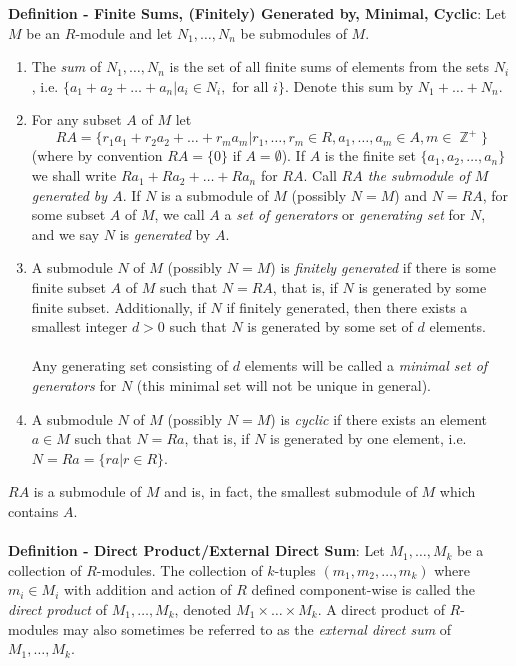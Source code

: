 \documentclass{article}
\DeclareMathOperator{\Z}{\mathbb{Z}}
\begin{document}
\textbf{Definition - Finite Sums, (Finitely) Generated by, Minimal, Cyclic}: Let $M$ be an $R$-module and let $N_1, \dots, N_n$ be submodules of $M$. \begin{enumerate}
    \item The \textit{sum} of $N_1, \dots, N_n$ is the set of all finite sums of elements from the sets $N_i$, i.e. $\{a_1 + a_2 + \dots + a_n | a_i \in N_i, \text{ for all } i\}$. Denote this sum by $N_1 + \dots + N_n$.
    \item For any subset $A$ of $M$ let $$RA = \{r_1 a_1 + r_2 a_2 + \dots +r_ma_m | r_1, \dots, r_m \in R, a_1, \dots, a_m \in A, m \in \Z^+\}$$ (where by convention $RA = \{0\}$ if $A = \emptyset$). If $A$ is the finite set $\{a_1 , a_2, \dots, a_n\}$ we shall write $Ra_1 + Ra_2 + \dots + Ra_n$ for $RA$. Call \textit{$RA$ the submodule of $M$ generated by $A$}. If $N$ is a submodule of $M$ (possibly $N = M$) and $N = RA$, for some subset $A$ of $M$, we call $A$ a \textit{set of generators} or \textit{generating set} for $N$, and we say $N$ is \textit{generated} by $A$.
    \item A submodule $N$ of $M$ (possibly $N = M$) is \textit{finitely generated} if there is some finite subset $A$ of $M$ such that $N = RA$, that is, if $N$ is generated by some finite subset. Additionally, if $N$ if finitely generated, then there exists a smallest integer $d > 0$ such that $N$ is generated by some set of $d$ elements. \\ \\
    Any generating set consisting of $d$ elements will be called a \textit{minimal set of generators} for $N$ (this minimal set will not be unique in general).
    \item A submodule $N$ of $M$ (possibly $N = M$) is \textit{cyclic} if there exists an element $a \in M$ such that $N = Ra$, that is, if $N$ is generated by one element, i.e. $N = Ra = \{ra | r \in R\}$. 
\end{enumerate} $ $ \\
$RA$ is a submodule of $M$ and is, in fact, the smallest submodule of $M$ which contains $A$. \\ \\
\textbf{Definition - Direct Product/External Direct Sum}: Let $M_1, \dots, M_k$ be a collection of $R$-modules. The collection of $k$-tuples
$(m_1, m_2, \dots, m_k)$ where $m_i \in M_i$ with addition and action of $R$ defined component-wise is called the \textit{direct product} of $M_1, \dots, M_k$, denoted $M_1 \times \dots \times M_k$. A direct product of $R$-modules may also sometimes be referred to as the \textit{external direct sum} of $M_1, \dots, M_k$. \\ \\
\end{document}
